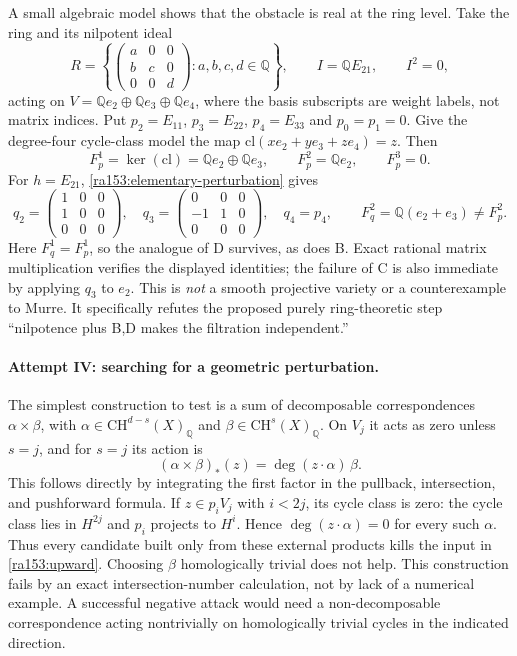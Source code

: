\documentclass[11pt]{article}
\newcommand{\Q}{\mathbb{Q}}
\begin{document}
A small algebraic model shows that the obstacle is real at the ring level.
Take the ring and its nilpotent ideal
\[
 R=\left\{\begin{pmatrix}a&0&0\\ b&c&0\\0&0&d\end{pmatrix}:a,b,c,d\in\Q\right\},
 \qquad I=\Q E_{21},\qquad I^2=0,
\]
acting on $V=\Q e_2\oplus\Q e_3\oplus\Q e_4$, where the basis subscripts are
weight labels, not matrix indices.  Put $p_2=E_{11}$, $p_3=E_{22}$,
$p_4=E_{33}$ and $p_0=p_1=0$.  Give the degree-four cycle-class model the map
$\mathrm{cl}(x e_2+y e_3+z e_4)=z$.  Then
\[
 F_p^1=\ker(\mathrm{cl})=\Q e_2\oplus\Q e_3,
 \qquad F_p^2=\Q e_2,
 \qquad F_p^3=0.
\]
For $h=E_{21}$, \eqref{ra153:elementary-perturbation} gives
\[
 q_2=\begin{pmatrix}1&0&0\\1&0&0\\0&0&0\end{pmatrix},\quad
 q_3=\begin{pmatrix}0&0&0\\-1&1&0\\0&0&0\end{pmatrix},\quad q_4=p_4,
 \qquad F_q^2=\Q(e_2+e_3)\ne F_p^2.
\]
Here $F_q^1=F_p^1$, so the analogue of D survives, as does B.  Exact rational
matrix multiplication verifies the displayed identities; the failure of C
is also immediate by applying $q_3$ to $e_2$.
This is \emph{not} a smooth projective variety or a counterexample to Murre.
It specifically refutes the proposed purely ring-theoretic step
``nilpotence plus B,D makes the filtration independent.''

\paragraph{Attempt IV: searching for a geometric perturbation.}
The simplest construction to test is a sum of decomposable correspondences
$\alpha\times\beta$, with
$\alpha\in\mathrm{CH}^{d-s}(X)_{\Q}$ and
$\beta\in\mathrm{CH}^{s}(X)_{\Q}$.  On $V_j$ it acts as zero unless $s=j$,
and for $s=j$ its action is
\begin{equation}\label{ra153:rank-one}
 (\alpha\times\beta)_*(z)=\deg(z\cdot\alpha)\,\beta.
\end{equation}
This follows directly by integrating the first factor in the pullback,
intersection, and pushforward formula.  If $z\in p_iV_j$ with $i<2j$, its
cycle class is zero: the cycle class lies in $H^{2j}$ and $p_i$ projects to
$H^i$.  Hence $\deg(z\cdot\alpha)=0$ for every such $\alpha$.  Thus every
candidate built only from these external products kills the input in
\eqref{ra153:upward}.  Choosing $\beta$ homologically trivial does not help.
This construction fails by an exact intersection-number calculation, not by
lack of a numerical example.  A successful negative attack would need a
non-decomposable correspondence acting nontrivially on homologically trivial
cycles in the indicated direction.
\end{document}
